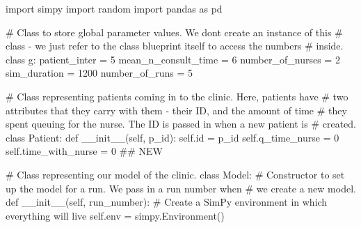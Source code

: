 \documentclass[
  letterpaper,
  DIV=11,
  numbers=noendperiod]{scrreprt}
\newenvironment{Shaded}{\begin{snugshade}}{\end{snugshade}}
\newcommand{\BuiltInTok}[1]{\textcolor[rgb]{0.00,0.23,0.31}{#1}}
\newcommand{\CommentTok}[1]{\textcolor[rgb]{0.37,0.37,0.37}{#1}}
\newcommand{\DecValTok}[1]{\textcolor[rgb]{0.68,0.00,0.00}{#1}}
\newcommand{\FunctionTok}[1]{\textcolor[rgb]{0.28,0.35,0.67}{#1}}
\newcommand{\ImportTok}[1]{\textcolor[rgb]{0.00,0.46,0.62}{#1}}
\newcommand{\KeywordTok}[1]{\textcolor[rgb]{0.00,0.23,0.31}{#1}}
\newcommand{\NormalTok}[1]{\textcolor[rgb]{0.00,0.23,0.31}{#1}}
\newcommand{\OperatorTok}[1]{\textcolor[rgb]{0.37,0.37,0.37}{#1}}
\newcommand{\VariableTok}[1]{\textcolor[rgb]{0.07,0.07,0.07}{#1}}
\begin{document}
\begin{tcolorbox}[enhanced jigsaw, rightrule=.15mm, colback=white, colframe=quarto-callout-note-color-frame, colbacktitle=quarto-callout-note-color!10!white, toprule=.15mm, coltitle=black, opacityback=0, titlerule=0mm, bottomtitle=1mm, breakable, title=\textcolor{quarto-callout-note-color}{\faInfo}\hspace{0.5em}{Click here to view the full code}, opacitybacktitle=0.6, toptitle=1mm, arc=.35mm, bottomrule=.15mm, leftrule=.75mm, left=2mm]

\begin{Shaded}
\begin{Highlighting}[]
\ImportTok{import}\NormalTok{ simpy}
\ImportTok{import}\NormalTok{ random}
\ImportTok{import}\NormalTok{ pandas }\ImportTok{as}\NormalTok{ pd}

\CommentTok{\# Class to store global parameter values.  We don\textquotesingle{}t create an instance of this}
\CommentTok{\# class {-} we just refer to the class blueprint itself to access the numbers}
\CommentTok{\# inside.}
\KeywordTok{class}\NormalTok{ g:}
\NormalTok{    patient\_inter }\OperatorTok{=} \DecValTok{5}
\NormalTok{    mean\_n\_consult\_time }\OperatorTok{=} \DecValTok{6}
\NormalTok{    number\_of\_nurses }\OperatorTok{=} \DecValTok{2}
\NormalTok{    sim\_duration }\OperatorTok{=} \DecValTok{1200}
\NormalTok{    number\_of\_runs }\OperatorTok{=} \DecValTok{5}

\CommentTok{\# Class representing patients coming in to the clinic.  Here, patients have}
\CommentTok{\# two attributes that they carry with them {-} their ID, and the amount of time}
\CommentTok{\# they spent queuing for the nurse.  The ID is passed in when a new patient is}
\CommentTok{\# created.}
\KeywordTok{class}\NormalTok{ Patient:}
    \KeywordTok{def} \FunctionTok{\_\_init\_\_}\NormalTok{(}\VariableTok{self}\NormalTok{, p\_id):}
        \VariableTok{self}\NormalTok{.}\BuiltInTok{id} \OperatorTok{=}\NormalTok{ p\_id}
        \VariableTok{self}\NormalTok{.q\_time\_nurse }\OperatorTok{=} \DecValTok{0}
        \VariableTok{self}\NormalTok{.time\_with\_nurse }\OperatorTok{=} \DecValTok{0} \CommentTok{\#\# NEW}

\CommentTok{\# Class representing our model of the clinic.}
\KeywordTok{class}\NormalTok{ Model:}
    \CommentTok{\# Constructor to set up the model for a run.  We pass in a run number when}
    \CommentTok{\# we create a new model.}
    \KeywordTok{def} \FunctionTok{\_\_init\_\_}\NormalTok{(}\VariableTok{self}\NormalTok{, run\_number):}
        \CommentTok{\# Create a SimPy environment in which everything will live}
        \VariableTok{self}\NormalTok{.env }\OperatorTok{=}\NormalTok{ simpy.Environment()}


\end{Highlighting}
\end{Shaded}
\end{tcolorbox}
\end{document}
